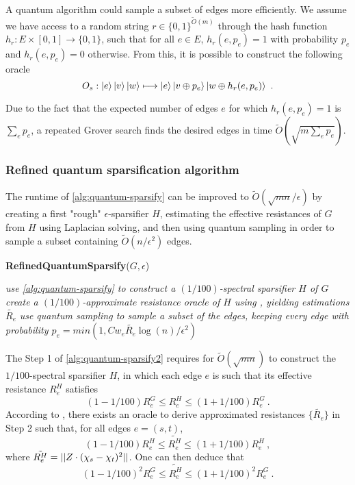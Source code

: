 A quantum algorithm could sample a subset of edges more efficiently.
We assume we have access to a random string $r \in \{0,1\}^{\tilde{O}(m)}$  through the hash function $h_r: E\times [0,1] \rightarrow \{0,1\}$,
such that for all $e\in E$, $h_r(e,p_e) = 1$ with probability $p_e$ and $h_r(e,p_e)=0$ otherwise.
From this, it is possible to construct the following oracle
\begin{equation*}
O_s : \ket{e} \ket{v} \ket{w} \longmapsto \ket{e} \ket{v \oplus p_e} \ket{w \oplus h_r(e,p_e)} \ .
\end{equation*}

Due to the fact that the expected number of edges $e$ for which $h_r(e,p_e)=1$ is $\sum_e p_e$, a repeated Grover search
finds the desired edges in time $\tilde{O}(\sqrt{m \sum_e p_e})$.


\subsubsection{Refined quantum sparsification algorithm}

The runtime of \autoref{alg:quantum-sparsify} can be improved to
$\tilde{O}(\sqrt{mn}/\epsilon)$ by creating a first "rough"
$\epsilon$-sparsifier $H$, estimating the effective resistances of $G$ from $H$
using Laplacian solving, and then using quantum sampling in order to sample a subset
containing $\tilde{O}(n/\epsilon^2)$ edges.


\begin{algorithm}
    \caption{\textbf{RefinedQuantumSparsify}($G,\epsilon$)}\label{alg:quantum-sparsify2}
    \begin{algorithmic}[1]

    \State \textit{use
    \autoref{alg:quantum-sparsify} to construct a $(1/100)$-spectral sparsifier $H$ of $G$}
    \State \textit{create a $(1/100)$-approximate resistance oracle of
    $H$ using , yielding estimations
    $\tilde{R_e}$}
    \State \textit{use quantum sampling to sample a subset of the
    edges, keeping every edge with probability $p_e =
    min(1,Cw_e\tilde{R_e}\log(n)/\epsilon^2)$}
    \end{algorithmic}
\end{algorithm}

The Step 1 of \autoref{alg:quantum-sparsify2} requires for
$\tilde{O}(\sqrt{mn})$ to construct the $1/100$-spectral sparsifier $H$, in which each edge $e$ is such that its effective resistance $R_e^H$ satisfies
\begin{equation*}
        (1-1/100) R^G_e \leq R^H_e \leq (1+1/100) R^G_e\ .
\end{equation*}
According to , there exists an oracle to derive approximated resistances $\{\tilde{R_e}\}$ in Step 2 such that, for all edges $e=(s,t)$,
\begin{equation*}
    (1-1/100) R^H_e \leq \tilde{R^H_e} \leq (1+1/100) R^H_e \ ,
\end{equation*}
where $\tilde{R^H_e} = || Z\cdot(\chi_s-\chi_t)^2 || $. One can then deduce that
\begin{equation*}
    (1-1/100)^2 R^G_e \leq \tilde{R^H_e} \leq (1+1/100)^2 R^G_e \ .
\end{equation*}


